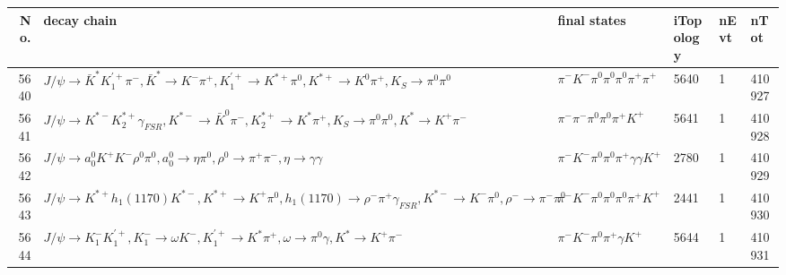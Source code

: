 \begin{table}[htbp] 
\begin{center}
\begin{small}
\begin{tabular}{rlllll}\hline\hline
 No. & decay chain & final states &  iTopology & nEvt & nTot \\\hline
5640&$J/\psi       \rightarrow \bar{K}^{*}   K_1^{'+}      \pi^{-}        , \bar{K}^{*}    \rightarrow K^{-}          \pi^{+}        , K_1^{'+}       \rightarrow K^{*+}         \pi^{0}        , K^{*+}          \rightarrow K^{0}          \pi^{+}        , K_{S}           \rightarrow \pi^{0}        \pi^{0}        $&$\pi^{-}        K^{-}          \pi^{0}        \pi^{0}        \pi^{0}        \pi^{+}        \pi^{+}        $& 5640&    1&410927\\
5641&$J/\psi       \rightarrow K^{*-}         K_2^{*+}       \gamma_{FSR} , K^{*-}          \rightarrow \bar{K}^{0}   \pi^{-}        , K_2^{*+}        \rightarrow K^{*}          \pi^{+}        , K_{S}           \rightarrow \pi^{0}        \pi^{0}        , K^{*}           \rightarrow K^{+}          \pi^{-}        $&$\pi^{-}        \pi^{-}        \pi^{0}        \pi^{0}        \pi^{+}        K^{+}          $& 5641&    1&410928\\
5642&$J/\psi       \rightarrow a_{0}^{0}      K^{+}          K^{-}          \rho^{0}      \pi^{0}        , a_{0}^{0}       \rightarrow \eta          \pi^{0}        , \rho^{0}       \rightarrow \pi^{+}        \pi^{-}        , \eta           \rightarrow \gamma       \gamma       $&$\pi^{-}        K^{-}          \pi^{0}        \pi^{0}        \pi^{+}        \gamma       \gamma       K^{+}          $& 2780&    1&410929\\
5643&$J/\psi       \rightarrow K^{*+}         h_{1}(1170)    K^{*-}         , K^{*+}          \rightarrow K^{+}          \pi^{0}        , h_{1}(1170)     \rightarrow \rho^{-}      \pi^{+}        \gamma_{FSR} , K^{*-}          \rightarrow K^{-}          \pi^{0}        , \rho^{-}       \rightarrow \pi^{-}        \pi^{0}        $&$\pi^{-}        K^{-}          \pi^{0}        \pi^{0}        \pi^{0}        \pi^{+}        K^{+}          $& 2441&    1&410930\\
5644&$J/\psi       \rightarrow K_{1}^{-}      K_1^{'+}      , K_{1}^{-}       \rightarrow \omega         K^{-}          , K_1^{'+}       \rightarrow K^{*}          \pi^{+}        , \omega          \rightarrow \pi^{0}        \gamma       , K^{*}           \rightarrow K^{+}          \pi^{-}        $&$\pi^{-}        K^{-}          \pi^{0}        \pi^{+}        \gamma       K^{+}          $& 5644&    1&410931\\

\end{tabular}
\end{small}
\end{center}
\end{table}
